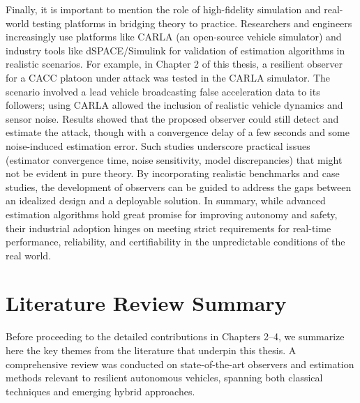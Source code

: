 Finally, it is important to mention the role of high-fidelity simulation and real-world testing platforms in bridging theory to practice. Researchers and engineers increasingly use platforms like CARLA (an open-source vehicle simulator) and industry tools like dSPACE/Simulink for validation of estimation algorithms in realistic scenarios. For example, in Chapter 2 of this thesis, a resilient observer for a CACC platoon under attack was tested in the CARLA simulator. The scenario involved a lead vehicle broadcasting false acceleration data to its followers; using CARLA allowed the inclusion of realistic vehicle dynamics and sensor noise. Results showed that the proposed observer could still detect and estimate the attack, though with a convergence delay of a few seconds and some noise-induced estimation error. Such studies underscore practical issues (estimator convergence time, noise sensitivity, model discrepancies) that might not be evident in pure theory. By incorporating realistic benchmarks and case studies, the development of observers can be guided to address the gaps between an idealized design and a deployable solution. In summary, while advanced estimation algorithms hold great promise for improving autonomy and safety, their industrial adoption hinges on meeting strict requirements for real-time performance, reliability, and certifiability in the unpredictable conditions of the real world.

\section{Literature Review Summary}
Before proceeding to the detailed contributions in Chapters 2–4, we summarize here the key themes from the literature that underpin this thesis. A comprehensive review was conducted on state-of-the-art observers and estimation methods relevant to resilient autonomous vehicles, spanning both classical techniques and emerging hybrid approaches.

